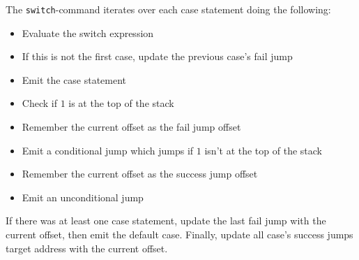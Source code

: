 \documentclass[11pt]{article}
\begin{document}
    The \texttt{switch}-command iterates over each case statement doing the following:
    \begin{itemize}
        \item Evaluate the switch expression
        \item If this is not the first case, update the previous case's fail jump
        \item Emit the case statement
        \item Check if \(1\) is at the top of the stack
        \item Remember the current offset as the fail jump offset
        \item Emit a conditional jump which jumps if \(1\) isn't at the top of the stack
        \item Remember the current offset as the success jump offset
        \item Emit an unconditional jump
    \end{itemize}
    If there was at least one case statement, update the last fail jump with the current offset, then emit the default
    case.
    Finally, update all case's success jumps target address with the current offset.
\end{document}
